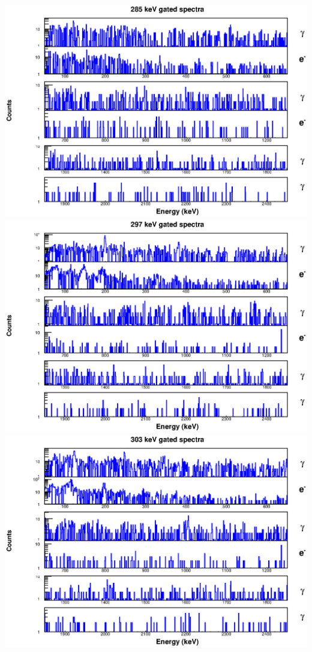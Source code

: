 \begin{landscape}
\includegraphics[scale=1.1]{154Gd_Appendix/285_combined.eps}
\includegraphics[scale=1.1]{154Gd_Appendix/297_combined.eps}
\includegraphics[scale=1.1]{154Gd_Appendix/303_combined.eps}

\end{landscape}
